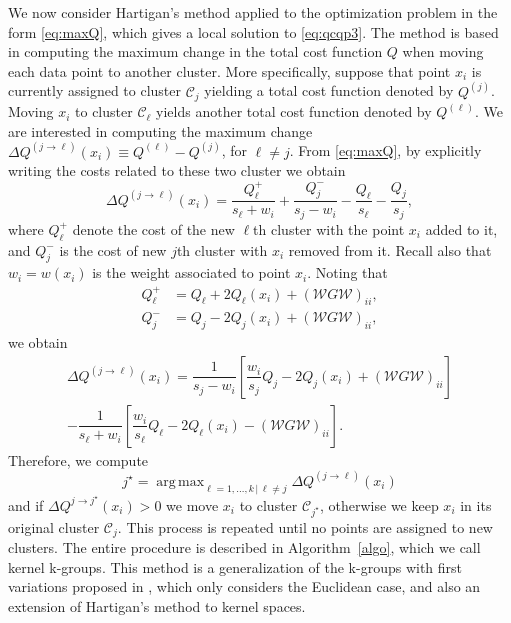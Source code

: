 \documentclass[10pt,journal,compsoc]{IEEEtran}
\DeclareMathOperator*{\argmax}{arg\,max}
\newcommand\C{{\mathcal{C}}}
\newcommand\W{{\mathcal{W}}}
\begin{document}
We now consider Hartigan's method \cite{Hartigan1975,Hartigan1979} 
applied to the optimization problem in the form \eqref{eq:maxQ}, which gives
a local solution to \eqref{eq:qcqp3}. 
The method is based in computing the maximum change
in the total cost function $Q$ when moving each data point to
another cluster. More specifically, 
suppose that point $x_i$
is currently assigned to  cluster $\C_j$ yielding
a total cost function denoted by $Q^{(j)}$.
Moving $x_i$ to cluster $\C_\ell$ yields another total cost function
denoted by $Q^{(\ell)}$. We are interested in computing the maximum 
change
$\Delta Q^{(j\to \ell)} (x_i) \equiv Q^{(\ell)} - Q^{(j)}$, for $\ell\ne j$. 
From \eqref{eq:maxQ}, by explicitly writing the costs related to these 
two cluster we obtain
\begin{equation}
\label{eq:deltaQ}
\Delta Q^{(j\to \ell)} (x_i) = \dfrac{Q_\ell^{+}}{s_\ell+w_i} + 
\dfrac{Q_j^-}{s_j-w_i} - \dfrac{Q_\ell}{s_\ell} - \dfrac{Q_j}{s_j}  ,
\end{equation}
where $Q^{+}_\ell$ denote the cost of the new $\ell$th cluster
with the point $x_i$ added to it, and $Q^-_j$ is the cost of new 
$j$th cluster with $x_i$ removed from it. Recall also that $w_i=w(x_i)$
is the weight associated to point $x_i$. Noting that 
\begin{align}
Q_\ell^{+} &= Q_\ell + 2 Q_\ell(x_i) + (\W G \W)_{ii}, 
\label{eq:Qplus} \\
Q_j^{-} &= Q_j - 2 Q_j(x_i) + (\W G \W)_{ii}, 
\label{eq:Qminus}
\end{align}
we obtain
\begin{multline}
\label{eq:changeQ}
\Delta Q^{(j \to \ell)}(x_i)  = 
\dfrac{1}{s_j - w_i}  \left[ \dfrac{w_i}{s_j}Q_j 
- 2 Q_j(x_i) + (\W G \W)_{ii} \right] \\
- \dfrac{1}{s_\ell + w_i}\left[ \dfrac{w_i}{s_\ell}Q_\ell - 2 Q_\ell(x_i) 
- (\W G \W )_{ii} \right].
\end{multline}
Therefore, we compute
\begin{equation}
j^\star = \argmax_{\ell=1,\dotsc,k \, | \, \ell\ne j} 
\Delta Q^{(j \to \ell)}(x_i)
\end{equation}
and if $\Delta Q^{j \to j^\star}(x_i) > 0$ 
we move $x_i$ to cluster $\C_{j^\star}$, otherwise 
we keep $x_i$ in its original cluster $\C_j$. 
This process is repeated
until no points are assigned to new clusters. 
The entire procedure is described in Algorithm~\ref{algo}, which we
call kernel k-groups. This method is a generalization of the k-groups
with first variations proposed in \cite{Kgroups}, which only considers
the Euclidean case, and also an extension
of Hartigan's method to kernel spaces.
\end{document}
